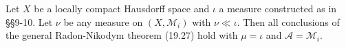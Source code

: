 Let $X$ be a locally compact Hausdorff space and $\iota$ a measure constructed as in \S\S 9-10. Let $\nu$ be any measure on $(X, \mathcal{M}_i)$ with $\nu \ll \iota$. Then all conclusions of the general Radon-Nikodym theorem (19.27) hold with $\mu = \iota$ and $\mathcal{A} = \mathcal{M}_i$.
